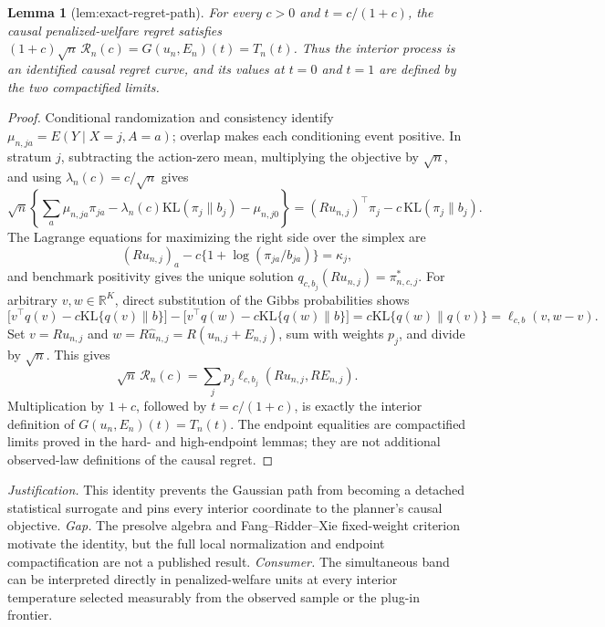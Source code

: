 \documentclass{article}
\newtheorem{lemma}{Lemma}
\begin{document}
\begin{lemma}[lem:exact-regret-path]\label{lem:exact-regret-path}
For every \(c>0\) and \(t=c/(1+c)\), the causal penalized-welfare regret satisfies \((1+c)\sqrt n\,\mathscr R_n(c)=G(u_n,E_n)(t)=T_n(t)\). Thus the interior process is an identified causal regret curve, and its values at \(t=0\) and \(t=1\) are defined by the two compactified limits.
\end{lemma}
\begin{proof}
Conditional randomization and consistency identify \(\mu_{n,ja}=E(Y\mid X=j,A=a)\); overlap makes each conditioning event positive.  In stratum \(j\), subtracting the action-zero mean, multiplying the objective by \(\sqrt n\), and using \(\lambda_n(c)=c/\sqrt n\) gives
\[
 \sqrt n\left\{\sum_a\mu_{n,ja}\pi_{ja}-\lambda_n(c)\mathrm{KL}(\pi_j\|b_j)-\mu_{n,j0}\right\}
 =(Ru_{n,j})^\top\pi_j-c\,\mathrm{KL}(\pi_j\|b_j).
\]
The Lagrange equations for maximizing the right side over the simplex are
\[
 (Ru_{n,j})_a-c\{1+\log(\pi_{ja}/b_{ja})\}=\kappa_j,
\]
and benchmark positivity gives the unique solution \(q_{c,b_j}(Ru_{n,j})=\pi^*_{n,c,j}\).  For arbitrary \(v,w\in\mathbb R^K\), direct substitution of the Gibbs probabilities shows
\[
 \big[v^\top q(v)-c\mathrm{KL}\{q(v)\|b\}\big]
 -\big[v^\top q(w)-c\mathrm{KL}\{q(w)\|b\}\big]
 =c\mathrm{KL}\{q(w)\|q(v)\}=\ell_{c,b}(v,w-v).
\]
Set \(v=Ru_{n,j}\) and \(w=R\widehat u_{n,j}=R(u_{n,j}+E_{n,j})\), sum with weights \(p_j\), and divide by \(\sqrt n\).  This gives
\[
 \sqrt n\,\mathscr R_n(c)=\sum_jp_j\ell_{c,b_j}(Ru_{n,j},RE_{n,j}).
\]
Multiplication by \(1+c\), followed by \(t=c/(1+c)\), is exactly the interior definition of \(G(u_n,E_n)(t)=T_n(t)\).  The endpoint equalities are compactified limits proved in the hard- and high-endpoint lemmas; they are not additional observed-law definitions of the causal regret.
\end{proof}
\par\smallskip\noindent \textit{Justification.} This identity prevents the Gaussian path from becoming a detached statistical surrogate and pins every interior coordinate to the planner's causal objective. \textit{Gap.} The presolve algebra and Fang--Ridder--Xie fixed-weight criterion motivate the identity, but the full local normalization and endpoint compactification are not a published result. \textit{Consumer.} The simultaneous band can be interpreted directly in penalized-welfare units at every interior temperature selected measurably from the observed sample or the plug-in frontier.
\end{document}
